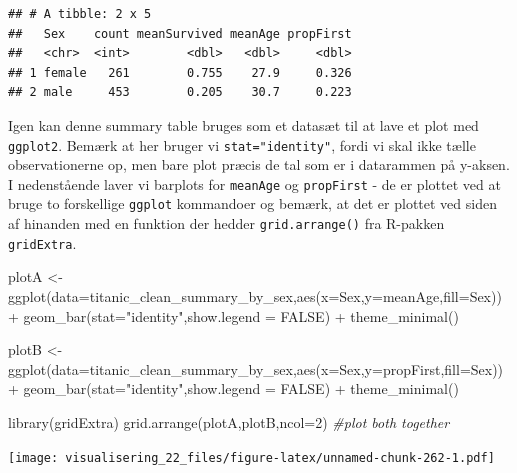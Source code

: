 \documentclass[
]{book}
\newenvironment{Shaded}{\begin{snugshade}}{\end{snugshade}}
\newcommand{\AttributeTok}[1]{\textcolor[rgb]{0.77,0.63,0.00}{#1}}
\newcommand{\CommentTok}[1]{\textcolor[rgb]{0.56,0.35,0.01}{\textit{#1}}}
\newcommand{\ConstantTok}[1]{\textcolor[rgb]{0.00,0.00,0.00}{#1}}
\newcommand{\DecValTok}[1]{\textcolor[rgb]{0.00,0.00,0.81}{#1}}
\newcommand{\FunctionTok}[1]{\textcolor[rgb]{0.00,0.00,0.00}{#1}}
\newcommand{\NormalTok}[1]{#1}
\newcommand{\OtherTok}[1]{\textcolor[rgb]{0.56,0.35,0.01}{#1}}
\newcommand{\SpecialCharTok}[1]{\textcolor[rgb]{0.00,0.00,0.00}{#1}}
\newcommand{\StringTok}[1]{\textcolor[rgb]{0.31,0.60,0.02}{#1}}
\begin{document}
\begin{verbatim}
## # A tibble: 2 x 5
##   Sex    count meanSurvived meanAge propFirst
##   <chr>  <int>        <dbl>   <dbl>     <dbl>
## 1 female   261        0.755    27.9     0.326
## 2 male     453        0.205    30.7     0.223
\end{verbatim}

Igen kan denne summary table bruges som et datasæt til at lave et plot med \texttt{ggplot2}. Bemærk at her bruger vi \texttt{stat="identity"}, fordi vi skal ikke tælle observationerne op, men bare plot præcis de tal som er i datarammen på y-aksen. I nedenstående laver vi barplots for \texttt{meanAge} og \texttt{propFirst} - de er plottet ved at bruge to forskellige \texttt{ggplot} kommandoer og bemærk, at det er plottet ved siden af hinanden med en funktion der hedder \texttt{grid.arrange()} fra R-pakken \texttt{gridExtra}.

\begin{Shaded}
\begin{Highlighting}[]
\NormalTok{plotA }\OtherTok{\textless{}{-}} \FunctionTok{ggplot}\NormalTok{(}\AttributeTok{data=}\NormalTok{titanic\_clean\_summary\_by\_sex,}\FunctionTok{aes}\NormalTok{(}\AttributeTok{x=}\NormalTok{Sex,}\AttributeTok{y=}\NormalTok{meanAge,}\AttributeTok{fill=}\NormalTok{Sex)) }\SpecialCharTok{+} 
  \FunctionTok{geom\_bar}\NormalTok{(}\AttributeTok{stat=}\StringTok{"identity"}\NormalTok{,}\AttributeTok{show.legend =} \ConstantTok{FALSE}\NormalTok{) }\SpecialCharTok{+} 
  \FunctionTok{theme\_minimal}\NormalTok{()}

\NormalTok{plotB }\OtherTok{\textless{}{-}} \FunctionTok{ggplot}\NormalTok{(}\AttributeTok{data=}\NormalTok{titanic\_clean\_summary\_by\_sex,}\FunctionTok{aes}\NormalTok{(}\AttributeTok{x=}\NormalTok{Sex,}\AttributeTok{y=}\NormalTok{propFirst,}\AttributeTok{fill=}\NormalTok{Sex)) }\SpecialCharTok{+} 
  \FunctionTok{geom\_bar}\NormalTok{(}\AttributeTok{stat=}\StringTok{"identity"}\NormalTok{,}\AttributeTok{show.legend =} \ConstantTok{FALSE}\NormalTok{) }\SpecialCharTok{+} 
  \FunctionTok{theme\_minimal}\NormalTok{()}

\FunctionTok{library}\NormalTok{(gridExtra)}
\FunctionTok{grid.arrange}\NormalTok{(plotA,plotB,}\AttributeTok{ncol=}\DecValTok{2}\NormalTok{) }\CommentTok{\#plot both together}
\end{Highlighting}
\end{Shaded}

\texttt{[image: visualisering\_22\_files/figure-latex/unnamed-chunk-262-1.pdf]}
\end{document}
